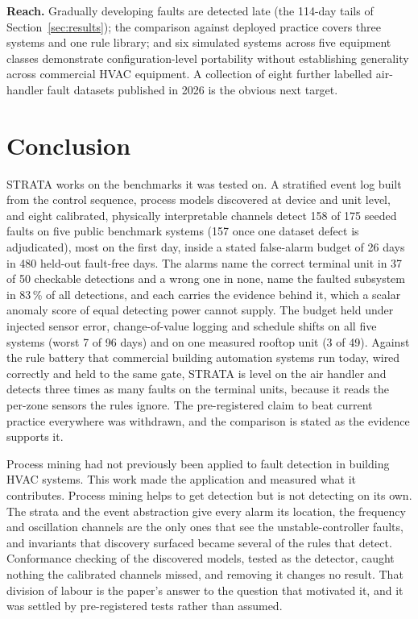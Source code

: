 \documentclass[11pt,letterpaper]{article}
\begin{document}
\textbf{Reach.} Gradually developing faults are detected late (the 114-day tails of Section~\ref{sec:results}); the comparison against deployed practice covers three systems and one rule library; and six simulated systems across five equipment classes demonstrate configuration-level portability without establishing generality across commercial HVAC equipment. A collection of eight further labelled air-handler fault datasets published in 2026 \cite{ghalamsiah2026ahudatasets} is the obvious next target.

\section{Conclusion}
\label{sec:conclusion}

STRATA works on the benchmarks it was tested on. A stratified event log built from the control sequence, process models discovered at device and unit level, and eight calibrated, physically interpretable channels detect 158 of 175 seeded faults on five public benchmark systems (157 once one dataset defect is adjudicated), most on the first day, inside a stated false-alarm budget of 26 days in 480 held-out fault-free days. The alarms name the correct terminal unit in 37 of 50 checkable detections and a wrong one in none, name the faulted subsystem in 83\,\% of all detections, and each carries the evidence behind it, which a scalar anomaly score of equal detecting power cannot supply. The budget held under injected sensor error, change-of-value logging and schedule shifts on all five systems (worst 7 of 96 days) and on one measured rooftop unit (3 of 49). Against the rule battery that commercial building automation systems run today, wired correctly and held to the same gate, STRATA is level on the air handler and detects three times as many faults on the terminal units, because it reads the per-zone sensors the rules ignore. The pre-registered claim to beat current practice everywhere was withdrawn, and the comparison is stated as the evidence supports it.

Process mining had not previously been applied to fault detection in building HVAC systems. This work made the application and measured what it contributes. Process mining helps to get detection but is not detecting on its own. The strata and the event abstraction give every alarm its location, the frequency and oscillation channels are the only ones that see the unstable-controller faults, and invariants that discovery surfaced became several of the rules that detect. Conformance checking of the discovered models, tested as the detector, caught nothing the calibrated channels missed, and removing it changes no result. That division of labour is the paper's answer to the question that motivated it, and it was settled by pre-registered tests rather than assumed.
\end{document}
